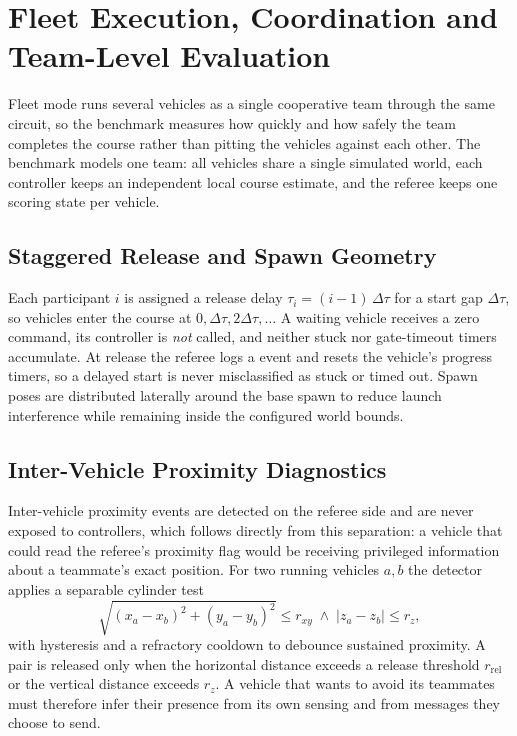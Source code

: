 \section{Fleet Execution, Coordination and Team-Level Evaluation}
\label{sec:fleet}

Fleet mode runs several vehicles as a single cooperative team through the same
circuit, so the benchmark measures how quickly and how safely the team completes
the course rather than pitting the vehicles against each other.
The benchmark models one team: all vehicles share a single simulated world, each
controller keeps an independent local course estimate, and the referee keeps one
scoring state per vehicle.

\subsection{Staggered Release and Spawn Geometry}

Each participant $i$ is assigned a release delay $\tau_i=(i-1)\,\Delta\tau$ for a
start gap $\Delta\tau$, so vehicles enter the course at
$0,\Delta\tau,2\Delta\tau,\dots$ A waiting vehicle receives a zero command, its
controller  is \emph{not} called, and neither stuck nor gate-timeout
timers accumulate. At release the referee logs a 
event and resets the vehicle's progress timers, so a delayed start is never
misclassified as stuck or timed out. Spawn poses are distributed laterally around
the base spawn to reduce launch interference while remaining inside the configured
world bounds.

\subsection{Inter-Vehicle Proximity Diagnostics}

Inter-vehicle proximity events are detected on the referee side and are never
exposed to controllers, which follows directly from this separation: a
vehicle that could read the referee's proximity flag would be receiving
privileged information about a teammate's exact position. For two running
vehicles $a,b$ the detector applies a separable cylinder test
\begin{equation}
\label{eq:ivc}
\sqrt{(x_a-x_b)^2+(y_a-y_b)^2}\le r_{xy}\;\wedge\;|z_a-z_b|\le r_z,
\end{equation}
with hysteresis and a refractory cooldown to debounce sustained proximity. A
pair is released only when the horizontal distance exceeds a release threshold
$r_{\mathrm{rel}}$ or the vertical distance exceeds $r_z$. A vehicle that wants
to avoid its teammates must therefore infer their presence from its own sensing
and from messages they choose to send.

